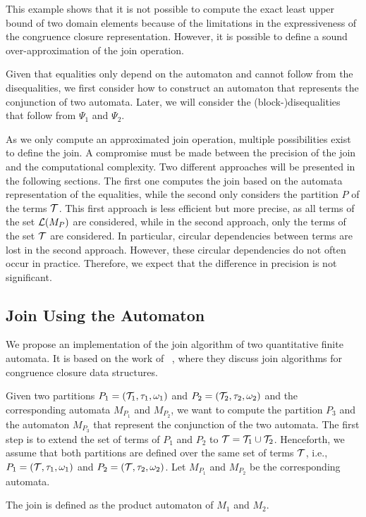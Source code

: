 This example shows that it is not possible to compute the exact least upper bound of two domain elements because of the limitations in the expressiveness of the congruence closure representation.
However, it is possible to define a sound over-approximation of the join operation.

Given that equalities only depend on the automaton and cannot follow from the disequalities, we first consider how to construct an automaton that represents the conjunction of two automata.
Later, we will consider the (block-)disequalities that follow from $\Psi_1$ and $\Psi_2$.

As we only compute an approximated join operation, multiple possibilities exist to define the join.
A compromise must be made between the precision of the join and the computational complexity.
Two different approaches will be presented in the following sections.
The first one computes the join based on the automata representation of the equalities, while the second only considers the partition $P$ of the terms $\mathcal{T}$.
This first approach is less efficient but more precise, as all terms of the set $\mathcal{L}(M_P)$ are considered, while in the second approach, only the terms of the set $\mathcal{T}$ are considered.
In particular, circular dependencies between terms are lost in the second approach.
However, these circular dependencies do not often occur in practice.
Therefore, we expect that the difference in precision is not significant.
\subsection{Join Using the Automaton}

We propose an implementation of the join algorithm of two quantitative finite automata.
It is based on the work of ~\textcite{join}, where they discuss join algorithms for congruence closure data structures.

Given two partitions $P_1 = (\mathcal{T}_1, \tau_1, \omega_1)$ and $P_2 = (\mathcal{T}_2, \tau_2, \omega_2)$ and the corresponding automata $M_{P_1}$ and $M_{P_2}$, we want to compute the partition $P_3$ and the automaton $M_{P_3}$ that represent the conjunction of the two automata.
The first step is to extend the set of terms of $P_1$ and $P_2$ to $\mathcal{T} = \mathcal{T}_1 \cup \mathcal{T}_2$.
Henceforth, we assume that both partitions are defined over the same set of terms $\mathcal{T}$,
i.e., $P_1 = (\mathcal{T}, \tau_1, \omega_1)$ and $P_2 = (\mathcal{T}, \tau_2, \omega_2)$.
Let $M_{P_1}$ and $M_{P_2}$ be the corresponding automata.

The join is defined as the product automaton of $M_1$ and $M_2$.

